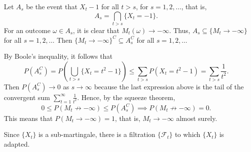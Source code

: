 \documentclass{homework}
\newcommand{\fil}{\mathcal{F}}
\begin{document}
	\question Let $A_s$ be the event that $X_t -1$ for all $t>s$, for $s=1,2,\dots$, that is,
	\begin{equation*}
		A_s = \bigcap_{t>s}\{X_t = -1\}.
	\end{equation*}
	For an outcome $\omega \in A_s$, it is clear that $M_t(\omega) \to -\infty$. Thus, $A_s \subseteq\{M_t \to -\infty\}$ for all $s =1,2,\dots$ Then $\{M_t\to-\infty\}^C \subseteq A_s^C$ for all $s=1,2,\dots$
	
	By Boole's inequality, it follows that
	\begin{equation*}
		P\left(A_s^C\right) = P\left(\bigcup_{t> s}\{X_t = t^2-1\}\right) \le \sum_{t>s}P(X_t = t^2-1) = \sum_{t>s}\frac{1}{t^2}.
	\end{equation*}
	Then $P\left(A_s^C\right) \to 0$ as $s \to \infty$ because the last expression above is the tail of the convergent sum $\sum\limits_{t=1}^\infty\frac{1}{t^2}$. Hence, by the squeeze theorem,
	\begin{equation*}
		0 \le P(M_t\not\to-\infty) \le P(A_s^C) \implies P(M_t\not\to-\infty) = 0.
	\end{equation*}
	This means that $P(M_t\to -\infty) =1$, that is, $M_t \to -\infty$ almost surely.
	
	\question Since $\{X_t\}$ is a sub-martingale, there is a filtration $\{\fil_t\}$ to which $\{X_t\}$ is adapted. 
	
\end{document}
